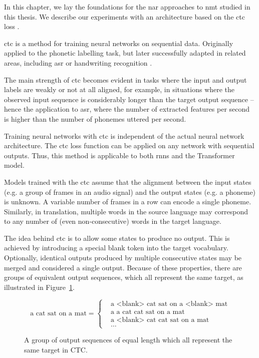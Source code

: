 \noindent
In this chapter, we lay the foundations for the \ac{nar} approaches to \ac{nmt}
studied in this thesis. We describe our experiments with an architecture based
on the \ac{ctc} loss \citep{libovicky-helcl-2018-end}.


\Ac{ctc} \citep{graves2006connectionist} is a method for training neural
networks on sequential data. Originally applied to the phonetic labelling task,
but later successfully adapted in related areas, including \ac{asr} or
handwriting recognition \citep{liwicki2007novel, eyben2009speech,
  graves2014towards}.

The main strength of \ac{ctc} becomes evident in tasks where the input and
output labels are weakly or not at all aligned, for example, in situations
where the observed input sequence is considerably longer than the target output
sequence -- hence the application to \ac{asr}, where the number of extracted
features per second is higher than the number of phonemes uttered per second.

Training neural networks with \ac{ctc} is independent of the actual neural
network architecture. The \ac{ctc} loss function can be applied on any network
with sequential outputs. Thus, this method is applicable to both \acp{rnn} and
the Transformer model.

Models trained with the \ac{ctc} assume that the alignment between the input
states (e.g. a group of frames in an audio signal) and the output states
(e.g. a phoneme) is unknown. A variable number of frames in a row can encode a
single phoneme. Similarly, in translation, multiple words in the source
language may correspond to any number of (even non-consecutive) words in the
target language.

The idea behind \ac{ctc} is to allow some states to produce no output. This is
achieved by introducing a special blank token into the target vocabulary.
Optionally, identical outputs produced by multiple consecutive states may be
merged and considered a single output. Because of these properties, there are
groups of equivalent output sequences, which all represent the same target, as
illustrated in Figure~\ref{fig:ctc-equivalent-sequences}.

\begin{figure}
  \centering
  \begin{minipage}{\textwidth}
    \begin{equation*}
        \text{a cat sat on a mat} =
        \begin{cases}
          & \text{a <blank> cat sat on a <blank> mat} \\
          & \text{a a cat cat sat on a mat} \\
          & \text{a <blank> cat cat sat on a mat} \\
          & \ldots
        \end{cases}
    \end{equation*}
  \end{minipage}
  \caption{A group of output sequences of equal length which all represent the
    same target in CTC.} %
  \label{fig:ctc-equivalent-sequences}
\end{figure}

